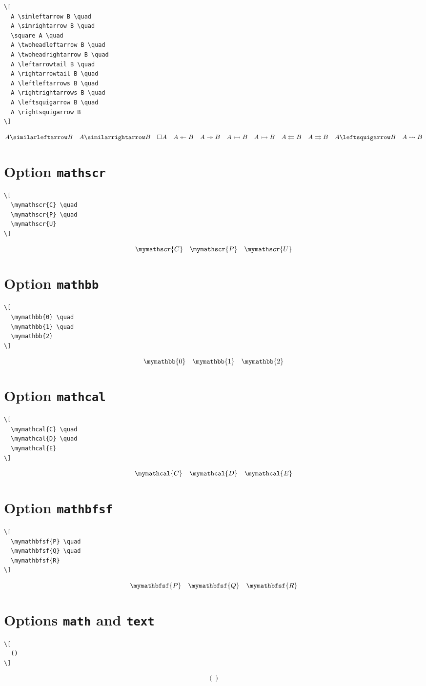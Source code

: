 \documentclass{article}
\begin{document}
\begin{verbatim}
\[
  A \simleftarrow B \quad
  A \simrightarrow B \quad
  \square A \quad
  A \twoheadleftarrow B \quad
  A \twoheadrightarrow B \quad
  A \leftarrowtail B \quad
  A \rightarrowtail B \quad
  A \leftleftarrows B \quad
  A \rightrightarrows B \quad
  A \leftsquigarrow B \quad
  A \rightsquigarrow B
\]
\end{verbatim}
%
\[
  A \simleftarrow B \quad
  A \simrightarrow B \quad
  \square A \quad
  A \twoheadleftarrow B \quad
  A \twoheadrightarrow B \quad
  A \leftarrowtail B \quad
  A \rightarrowtail B \quad
  A \leftleftarrows B \quad
  A \rightrightarrows B \quad
  A \leftsquigarrow B \quad
  A \rightsquigarrow B
\]

\section{Option \texttt{mathscr}}

\begin{verbatim}
\[
  \mymathscr{C} \quad
  \mymathscr{P} \quad
  \mymathscr{U}
\]
\end{verbatim}
%
\[
  \mymathscr{C} \quad
  \mymathscr{P} \quad
  \mymathscr{U}
\]

\section{Option \texttt{mathbb}}

\begin{verbatim}
\[
  \mymathbb{0} \quad
  \mymathbb{1} \quad
  \mymathbb{2}
\]
\end{verbatim}
%
\[
  \mymathbb{0} \quad
  \mymathbb{1} \quad
  \mymathbb{2}
\]

\section{Option \texttt{mathcal}}

\begin{verbatim}
\[
  \mymathcal{C} \quad
  \mymathcal{D} \quad
  \mymathcal{E}
\]
\end{verbatim}
%
\[
  \mymathcal{C} \quad
  \mymathcal{D} \quad
  \mymathcal{E}
\]

\section{Option \texttt{mathbfsf}}

\begin{verbatim}
\[
  \mymathbfsf{P} \quad
  \mymathbfsf{Q} \quad
  \mymathbfsf{R}
\]
\end{verbatim}
%
\[
  \mymathbfsf{P} \quad
  \mymathbfsf{Q} \quad
  \mymathbfsf{R}
\]

\section{Options \texttt{math} and \texttt{text}}

\blindmathtrue
\blindtext
\blindmathfalse

\begin{verbatim}
\[
  ()
\]
\end{verbatim}
%
\[
  ()
\]
\end{document}
